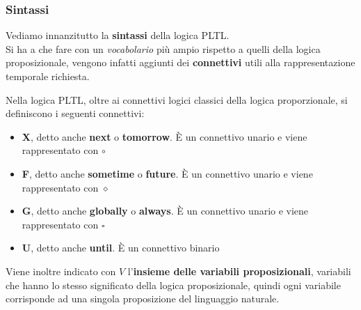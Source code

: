 \documentclass[a4paper,12pt, oneside]{book}
\begin{document}
\subsubsection{Sintassi}
Vediamo innanzitutto la \textbf{sintassi} della logica PLTL.\\
Si ha a che fare con un \textit{vocabolario} più ampio rispetto a quelli della
logica proposizionale, vengono infatti aggiunti dei \textbf{connettivi} utili
alla rappresentazione temporale richiesta.
\begin{definizione}
  Nella logica PLTL, oltre ai connettivi logici classici della logica
  proporzionale, si definiscono i seguenti connettivi:
  \begin{itemize}
    \item \textbf{X}, detto anche \textbf{next} o \textbf{tomorrow}. È un
    connettivo unario e viene rappresentato con $\circ$
    \item \textbf{F}, detto anche \textbf{sometime} o \textbf{future}. È un
    connettivo unario e viene rappresentato con $\diamond$
    \item \textbf{G}, detto anche \textbf{globally} o \textbf{always}. È un
    connettivo unario e viene rappresentato con $\square$
    \item \textbf{U}, detto anche \textbf{until}. È un connettivo binario
  \end{itemize}
  Viene inoltre indicato con $V$ l'\textbf{insieme delle variabili
    proposizionali}, variabili che hanno lo stesso significato della logica
  proposizionale, quindi ogni variabile corrisponde ad una singola proposizione
  del linguaggio naturale. 
\end{definizione}
\end{document}
